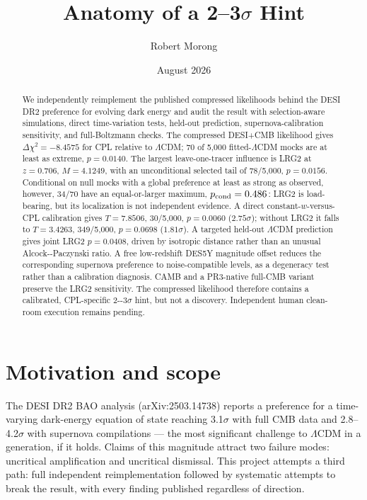 \documentclass[aps,prd,preprint,superscriptaddress,nofootinbib]{revtex4-2}
\begin{document}
\title{Anatomy of a 2--3$\sigma$ Hint}
\author{Robert Morong}
\date{August 2026}
\begin{abstract}
We independently reimplement the published compressed likelihoods behind
the DESI DR2 preference for evolving dark energy and audit the result
with selection-aware simulations, direct time-variation tests, held-out
prediction, supernova-calibration sensitivity, and full-Boltzmann
checks. The compressed DESI+CMB likelihood gives
\(\Delta\chi^2=-8.4575\) for CPL relative to \(\Lambda\)CDM; 70 of 5,000
fitted-\(\Lambda\)CDM mocks are at least as extreme, \(p=0.0140\). The
largest leave-one-tracer influence is LRG2 at \(z=0.706\), \(M=4.1249\),
with an unconditional selected tail of 78/5,000, \(p=0.0156\).
Conditional on null mocks with a global preference at least as strong as
observed, however, 34/70 have an equal-or-larger maximum,
\(p_{\rm cond}=0.486\): LRG2 is load-bearing, but its localization is
not independent evidence. A direct constant-\(w\)-versus-CPL calibration
gives \(T=7.8506\), 30/5,000, \(p=0.0060\) (\(2.75\sigma\)); without
LRG2 it falls to \(T=3.4263\), 349/5,000, \(p=0.0698\) (\(1.81\sigma\)).
A targeted held-out \(\Lambda\)CDM prediction gives joint LRG2
\(p=0.0408\), driven by isotropic distance rather than an unusual
Alcock-\/-Paczynski ratio. A free low-redshift DES5Y magnitude offset
reduces the corresponding supernova preference to noise-compatible
levels, as a degeneracy test rather than a calibration diagnosis. CAMB
and a PR3-native full-CMB variant preserve the LRG2 sensitivity. The
compressed likelihood therefore contains a calibrated, CPL-specific
2-\/-3\(\sigma\) hint, but not a discovery. Independent human clean-room
execution remains pending.
\end{abstract}
\maketitle
\sloppy

\section{Motivation and scope}\label{motivation-and-scope}

The DESI DR2 BAO analysis (arXiv:2503.14738) reports a preference for a
time-varying dark-energy equation of state reaching 3.1\(\sigma\) with
full CMB data and 2.8--4.2\(\sigma\) with supernova compilations --- the
most significant challenge to \(\Lambda\)CDM in a generation, if it
holds. Claims of this magnitude attract two failure modes: uncritical
amplification and uncritical dismissal. This project attempts a third
path: full independent reimplementation followed by systematic attempts
to break the result, with every finding published regardless of
direction.
\end{document}
